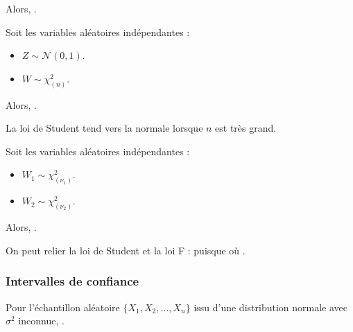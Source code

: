 \documentclass[10pt, french]{article}
\begin{document}
\begin{multicols*}{2}
\begin{rappel_enhanced}
Alors, .
\end{rappel_enhanced}

\begin{rappel_enhanced}
Soit les variables aléatoires indépendantes :
\begin{itemize}
	\item	$Z \sim \mathcal{N}(0, 1)$.
	\item	$W \sim \chi^{2}_{(n)}$.
\end{itemize}

Alors, .\\

\tcbline

La loi de Student tend vers la normale lorsque $n$ est très grand.
\end{rappel_enhanced}

\begin{rappel_enhanced}
Soit les variables aléatoires indépendantes :
\begin{itemize}
	\item	$W_{1} \sim \chi^{2}_{(\nu_{1})}$.
	\item	$W_{2} \sim \chi^{2}_{(\nu_{2})}$.
\end{itemize}

Alors, .\\

\tcbline

On peut relier la loi de Student et la loi F :  puisque  où .
\end{rappel_enhanced}



\columnbreak
\subsubsection{Intervalles de confiance}
%

\begin{definitionNOHFILLsub}
Pour l'échantillon aléatoire $\{X_{1}, X_{2}, \dots, X_{n}\}$ issu d'une distribution normale avec $\sigma^{2}$ inconnue, . \\


\end{definitionNOHFILLsub}
\end{multicols*}
\end{document}
